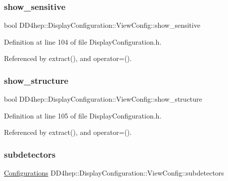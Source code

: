 \subsubsection{\texorpdfstring{show\+\_\+sensitive}{show\_sensitive}}
{\footnotesize\ttfamily bool D\+D4hep\+::\+Display\+Configuration\+::\+View\+Config\+::show\+\_\+sensitive}



Definition at line 104 of file Display\+Configuration.\+h.



Referenced by extract(), and operator=().

\hypertarget{class_d_d4hep_1_1_display_configuration_1_1_view_config_a354dde730ac96e0795b996a0c344c303}{}\label{class_d_d4hep_1_1_display_configuration_1_1_view_config_a354dde730ac96e0795b996a0c344c303} 
\subsubsection{\texorpdfstring{show\+\_\+structure}{show\_structure}}
{\footnotesize\ttfamily bool D\+D4hep\+::\+Display\+Configuration\+::\+View\+Config\+::show\+\_\+structure}



Definition at line 105 of file Display\+Configuration.\+h.



Referenced by extract(), and operator=().

\hypertarget{class_d_d4hep_1_1_display_configuration_1_1_view_config_ab1466448cad80dfdb76cc9f4c1f252b1}{}\label{class_d_d4hep_1_1_display_configuration_1_1_view_config_ab1466448cad80dfdb76cc9f4c1f252b1} 
\subsubsection{\texorpdfstring{subdetectors}{subdetectors}}
{\footnotesize\ttfamily \hyperlink{class_d_d4hep_1_1_display_configuration_ac43586ae2c70f106cc9027d452d383d7}{Configurations} D\+D4hep\+::\+Display\+Configuration\+::\+View\+Config\+::subdetectors}



